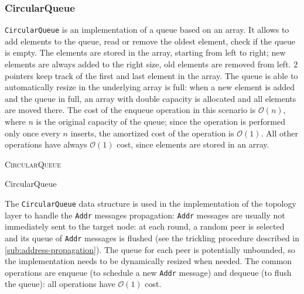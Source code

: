\subsubsection{CircularQueue}
\texttt{CircularQueue} is an implementation of a queue based on an array.
It allows to add elements to the queue, read or remove the oldest element, check if the queue is empty.
The elements are stored in the array, starting from left to right;
new elements are always added to the right size, old elements are removed from left.
\num{2} pointers keep track of the first and last element in the array.
The queue is able to automatically resize in the underlying array is full:
when a new element is added and the queue in full, an array with double capacity is allocated and all elements are moved there.
The cost of the enqueue operation in this scenario is $\mathcal{O}(n)$, where $n$ is the original capacity of the queue;
since the operation is performed only once every $n$ inserts, the amortized cost of the operation is $\mathcal{O}(1)$.
All other operations have always $\mathcal{O}(1)$ cost, since elements are stored in an array.

\medskip
\begin{algorithm}[h]
	\DontPrintSemicolon



	\BlankLine
	 \;
	\textsc{CircularQueue}  \;

	\BlankLine
	 \;
	\Void {} \;

	\BlankLine
	 \;
	\Object \Dequeue{} \;

	\BlankLine
	 \;
	\Object \Head{} \;

	\BlankLine
	 \;
	\Boolean \IsEmpty{} \;

	\caption{CircularQueue}
	\label{alg:circular-queue}
\end{algorithm}
\smallskip

The \texttt{CircularQueue} data structure is used in the implementation of the topology layer to handle the \texttt{Addr} messages propagation:
\texttt{Addr} messages are usually not immediately sent to the target node:
at each round, a random peer is selected and its queue of \texttt{Addr} messages is flushed (see the trickling procedure described in \cref{sub:address-propagation}).
The queue for each peer is potentially unbounded, so the implementation needs to be dynamically resized when needed.
The common operations are enqueue (to schedule a new \texttt{Addr} message) and dequeue (to flush the queue):
all operations have $\mathcal{O}(1)$ cost.

